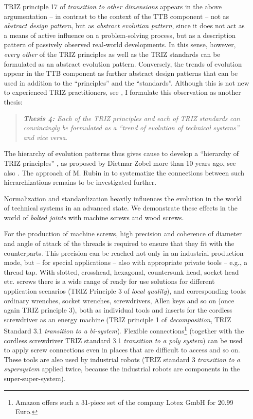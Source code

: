 \documentclass{llncs}
\begin{document}
TRIZ principle 17 of \emph{transition to other dimensions} appears in the
above argumentation -- in contrast to the context of the TTB component -- not
as \emph{abstract design pattern}, but as \emph{abstract evolution pattern},
since it does not act as a means of active influence on a problem-solving
process, but as a description pattern of passively observed real-world
developments. In this sense, however, \emph{every other} of the TRIZ
principles as well as the TRIZ standards can be formulated as an abstract
evolution pattern. Conversely, the trends of evolution appear in the TTB
component as further abstract design patterns that can be used in addition to
the ``principles'' and the ``standards''. Although this is not new to
experienced TRIZ practitioners, see \cite{Shub2006}, I formulate this
observation as another thesis:
\begin{quote}\it
 \textbf{Thesis 4:} Each of the TRIZ principles and each of TRIZ standards can
 convincingly be formulated as a ``trend of evolution of technical systems''
 and vice versa.
\end{quote}
The hierarchy of evolution patterns thus gives cause to develop a ``hierarchy
of TRIZ principles'' \cite[chapter 3]{Zobel2016}, as proposed by Dietmar Zobel
more than 10 years ago, see also \cite{Zobel2020}.  The approach of M. Rubin
in \cite{Rubin2019} to systematize the connections between such
hierarchizations remains to be investigated further.

Normalization and standardization heavily influences the evolution in the
world of technical systems in an advanced state.  We demonstrate these effects
in the world of \emph{bolted joints} with machine screws and wood screws.

For the production of machine screws, high precision and coherence of diameter
and angle of attack of the threads is required to ensure that they fit with
the counterparts. This precision can be reached not only in an industrial
production mode, but -- for special applications -- also with appropriate
private tools -- e.g., a thread tap. With slotted, crosshead, hexagonal,
countersunk head, socket head etc. screws there is a wide range of ready for
use solutions for different application scenarios (TRIZ Principle 3 of
\emph{local quality}), and corresponding tools: ordinary wrenches, socket
wrenches, screwdrivers, Allen keys and so on (once again TRIZ principle 3),
both as individual tools and inserts for the cordless screwdriver as an energy
machine (TRIZ principle 1 of \emph{decomposition}, TRIZ Standard 3.1
\emph{transition to a bi-system}).  Flexible connections\footnote{Amazon
  offers such a 31-piece set of the company Lotex GmbH for 20.99 Euro.}
(together with the cordless screwdriver TRIZ standard 3.1 \emph{transition to
  a poly system}) can be used to apply screw connections even in places that
are difficult to access and so on. These tools are also used by industrial
robots (TRIZ standard 3 \emph{transition to a supersystem} applied twice,
because the industrial robots are components in the super-super-system).
\end{document}
